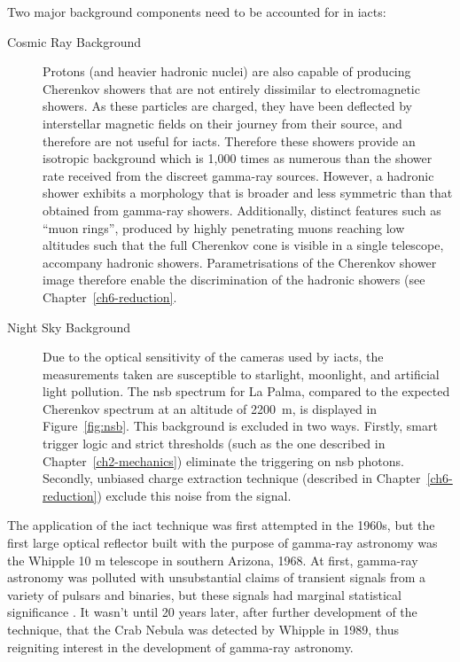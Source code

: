 Two major background components need to be accounted for in \glspl{iact}:
\begin{description}
\item [Cosmic Ray Background] Protons (and heavier hadronic nuclei) are also capable of producing Cherenkov showers that are not entirely dissimilar to electromagnetic showers. As these particles are charged, they have been deflected by interstellar magnetic fields on their journey from their source, and therefore are not useful for \glspl{iact}. Therefore these showers provide an isotropic background which is 1,000 times as numerous than the shower rate received from the discreet gamma-ray sources. However, a hadronic shower exhibits a morphology that is broader and less symmetric than that obtained from gamma-ray showers. Additionally, distinct features such as ``muon rings'', produced by highly penetrating muons reaching low altitudes such that the full Cherenkov cone is visible in a single telescope, accompany hadronic showers. Parametrisations of the Cherenkov shower image therefore enable the discrimination of the hadronic showers (see Chapter~\ref{ch6-reduction}. 
\item [Night Sky Background] Due to the optical sensitivity of the cameras used by \glspl{iact}, the measurements taken are susceptible to starlight, moonlight, and artificial light pollution. The \gls{nsb} spectrum for La Palma, compared to the expected Cherenkov spectrum at an altitude of \SI{2200}{m}, is displayed in Figure~\ref{fig:nsb}. This background is excluded in two ways. Firstly, smart trigger logic and strict thresholds (such as the one described in Chapter~\ref{ch2-mechanics}) eliminate the triggering on \gls{nsb} photons. Secondly, unbiased charge extraction technique (described in Chapter~\ref{ch6-reduction}) exclude this noise from the signal.
\end{description}

The application of the \gls{iact} technique was first attempted in the 1960s, but the first large optical reflector built with the purpose of gamma-ray astronomy was the Whipple 10 m telescope in southern Arizona, 1968. At first, gamma-ray astronomy was polluted with unsubstantial claims of transient signals from a variety of pulsars and binaries, but these signals had marginal statistical significance \cite[][p.~9]{Weekes2003}. It wasn't until 20 years later, after further development of the technique, that the Crab Nebula was detected by Whipple in 1989, thus reigniting interest in the development of gamma-ray astronomy.

